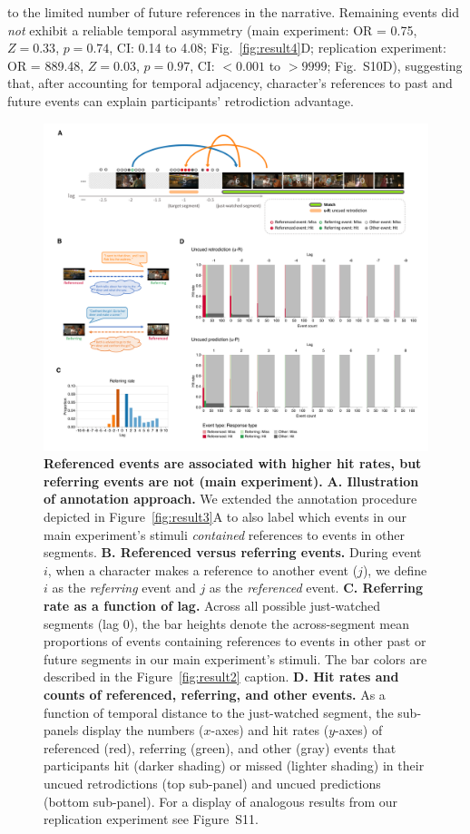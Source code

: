\documentclass[10pt]{article}
\newcommand{\refAdjacentCorrected}{S10}
\newcommand{\referringReferenced}{S11}
\begin{document}
to the limited number of future references in the narrative. Remaining events did \textit{not} exhibit a reliable temporal asymmetry (main experiment: OR = 0.75, $Z = 0.33$, $p = 0.74$, CI: 0.14 to 4.08; Fig.~\ref{fig:result4}D; replication experiment: OR = 889.48, $Z = 0.03$, $p = 0.97$, CI: $<0.001$ to $>9999$; Fig.~\refAdjacentCorrected D), suggesting that, after accounting for temporal adjacency, character's references to past and future events can explain participants' retrodiction advantage.

\begin{figure}[tp]
  \centering
  \includegraphics[width=\textwidth]{results5}

  \caption{\textbf{Referenced events are associated with higher hit rates, but referring events are not (main experiment).} \textbf{A. Illustration of annotation approach.} We extended the annotation procedure depicted in Figure~\ref{fig:result3}A to also label which events in our main experiment's stimuli \textit{contained} references to events in other segments. \textbf{B. Referenced versus referring events.} During event $i$, when a character makes a reference to another event ($j$), we define $i$ as the \textit{referring} event and $j$ as the \textit{referenced} event. \textbf{C. Referring rate as a function of lag.} Across all possible just-watched segments (lag 0), the bar heights denote the across-segment mean proportions of events containing references to events in other past or future segments in our main experiment's stimuli. The bar colors are described in the Figure~\ref{fig:result2} caption. \textbf{D. Hit rates and counts of referenced, referring, and other events.} As a function of temporal distance to the just-watched segment, the sub-panels display the numbers ($x$-axes) and hit rates ($y$-axes) of referenced (red), referring (green), and other (gray) events that participants hit (darker shading) or missed (lighter shading) in their uncued retrodictions (top sub-panel) and uncued predictions (bottom sub-panel). For a display of analogous results from our replication experiment see Figure~\referringReferenced.}

  \label{fig:result5}
\end{figure}
\end{document}
